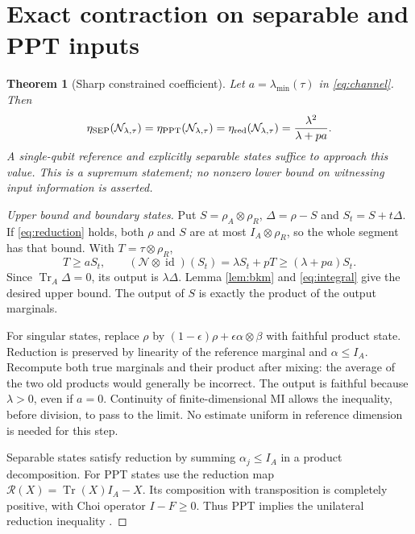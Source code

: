 \documentclass[11pt]{article}
\newtheorem{theorem}{Theorem}
\newcommand{\Tr}{\operatorname{Tr}}
\newcommand{\id}{\operatorname{id}}
\begin{document}
\section{Exact contraction on separable and PPT inputs}
\begin{theorem}[Sharp constrained coefficient]\label{thm:sharp}
Let $a=\lambda_{\min}(\tau)$ in \eqref{eq:channel}. Then
\begin{equation}\label{eq:sharp}
 \eta_{\rm SEP}(\mathcal N_{\lambda,\tau})
 =\eta_{\rm PPT}(\mathcal N_{\lambda,\tau})
 =\eta_{\rm red}(\mathcal N_{\lambda,\tau})
 =\frac{\lambda^2}{\lambda+pa}.
\end{equation}
A single-qubit reference and explicitly separable states suffice to approach this value. This is a supremum statement; no nonzero lower bound on witnessing input information is asserted.
\end{theorem}
\begin{proof}[Upper bound and boundary states]
Put $S=\rho_A\otimes\rho_R$, $\Delta=\rho-S$ and $S_t=S+t\Delta$. If \eqref{eq:reduction} holds, both $\rho$ and $S$ are at most $I_A\otimes\rho_R$, so the whole segment has that bound. With $T=\tau\otimes\rho_R$,
\[
 T\ge aS_t,\qquad
 (\mathcal N\otimes\id)(S_t)=\lambda S_t+pT\ge(\lambda+pa)S_t.
\]
Since $\Tr_A\Delta=0$, its output is $\lambda\Delta$. Lemma \ref{lem:bkm} and \eqref{eq:integral} give the desired upper bound. The output of $S$ is exactly the product of the output marginals.

For singular states, replace $\rho$ by $(1-\epsilon)\rho+\epsilon\alpha\otimes\beta$ with faithful product state. Reduction is preserved by linearity of the reference marginal and $\alpha\le I_A$. Recompute both true marginals and their product after mixing: the average of the two old products would generally be incorrect. The output is faithful because $\lambda>0$, even if $a=0$. Continuity of finite-dimensional MI allows the inequality, before division, to pass to the limit. No estimate uniform in reference dimension is needed for this step.

Separable states satisfy reduction by summing $\alpha_j\le I_A$ in a product decomposition. For PPT states use the reduction map $\mathcal R(X)=\Tr(X)I_A-X$. Its composition with transposition is completely positive, with Choi operator $I-F\ge0$. Thus PPT implies the unilateral reduction inequality \cite{reduction}.
\end{proof}
\end{document}
